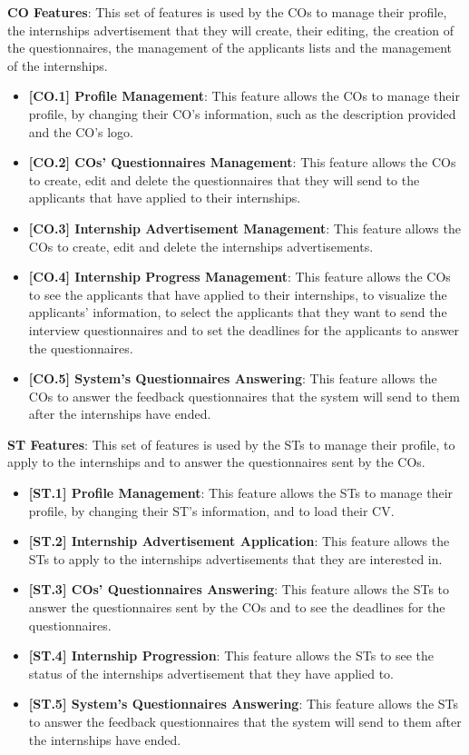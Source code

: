 \par \textbf{CO Features}: This set of features is used by the COs to manage their profile, the internships
advertisement that they will create, their editing, the creation of the questionnaires, the management of the applicants
lists and the management of the internships.

\begin{itemize}
    \item \textbf{[CO.1] Profile Management}: This feature allows the COs to manage their profile, by changing their
    CO's information, such as the description provided and the CO's logo.
    \item \textbf{[CO.2] COs' Questionnaires Management}: This feature allows the COs to create, edit and delete the 
    questionnaires that they will send to the applicants that have applied to their internships.
    \item \textbf{[CO.3] Internship Advertisement Management}: This feature allows the COs to create, edit and delete
    the internships advertisements.
    \item \textbf{[CO.4] Internship Progress Management}: This feature allows the COs to see the applicants that have
    applied to their internships, to visualize the applicants' information, to select the applicants that they want to
    send the interview questionnaires and to set the deadlines for the applicants to answer the questionnaires.
    \item \textbf{[CO.5] System's Questionnaires Answering}: This feature allows the COs to answer the feedback 
    questionnaires that the system will send to them after the internships have ended.
\end{itemize}

\par \textbf{ST Features}: This set of features is used by the STs to manage their profile, to apply to the 
internships and to answer the questionnaires sent by the COs.

\begin{itemize}
    \item \textbf{[ST.1] Profile Management}: This feature allows the STs to manage their profile, by changing their
    ST's information, and to load their CV.
    \item \textbf{[ST.2] Internship Advertisement Application}: This feature allows the STs to apply to the internships
    advertisements that they are interested in.
    \item \textbf{[ST.3] COs' Questionnaires Answering}: This feature allows the STs to answer the questionnaires sent by
    the COs and to see the deadlines for the questionnaires.
    \item \textbf{[ST.4] Internship Progression}: This feature allows the STs to see the status of the internships
    advertisement that they have applied to.
    \item \textbf{[ST.5] System's Questionnaires Answering}: This feature allows the STs to answer the feedback 
    questionnaires that the system will send to them after the internships have ended.
\end{itemize}

